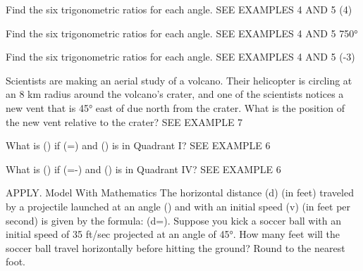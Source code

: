 \documentclass{article}
\newenvironment{practice}[2]{}{}        %
\newcommand{\answer}[1]{}               %
\newcommand{\placeholder}[2]{}          %
\newcommand{\te}[1]{}                   %
\begin{document}
\begin{practice}{28}{1}
Find the six trigonometric ratios for each angle. SEE EXAMPLES 4 AND 5
(\frac{13\pi}4)
\answer{(\sin\frac{13\pi}4=-\frac{\sqrt2}{2}); (\cos\frac{13\pi}4=-\frac{\sqrt2}{2}); (\tan\frac{13\pi}4=1); (\sec\frac{13\pi}4=-\sqrt2); (\csc\frac{13\pi}4=-\sqrt2); (\cot\frac{13\pi}4=1)}
\end{practice}
\begin{practice}{29}{1}
Find the six trigonometric ratios for each angle. SEE EXAMPLES 4 AND 5
750°
\answer{(\sin750°=\frac12); (\cos750°=\frac{\sqrt3}{2}); (\tan750°=\frac{\sqrt3}{3}); (\sec750°=\frac{2\sqrt3}{3}); (\csc750°=2); (\cot750°=\sqrt3)}
\end{practice}
\begin{practice}{30}{1}
Find the six trigonometric ratios for each angle. SEE EXAMPLES 4 AND 5
(-\frac{2\pi}3)
\answer{(\sin(-\frac{2\pi}3)=-\frac{\sqrt3}{2}); (\cos(-\frac{2\pi}3)=-\frac12); (\tan(-\frac{2\pi}3)=\sqrt3); (\sec(-\frac{2\pi}3)=-2); (\csc(-\frac{2\pi}3)=-\frac{2\sqrt3}{3}); (\cot(-\frac{2\pi}3)=\frac{\sqrt3}{3})}
\end{practice}
\begin{practice}{31}{2}
Scientists are making an aerial study of a volcano. Their helicopter is circling at an 8 km radius around the volcano's crater, and one of the scientists notices a new vent that is 45° east of due north from the crater. What is the position of the new vent relative to the crater? SEE EXAMPLE 7
\placeholder{illustration}{Overhead volcano crater with smoke; black circular helicopter path centered at crater, radius westward labeled 8 km. Yellow helicopter at east side, small glowing vent near northeast circumference.}
\answer{Sample: The point (4\sqrt2,4\sqrt2) represents a position that is about 5.7 km east and about 5.7 km north of the valley.}
\te{Printed ``valley''; likely ``crater''.}
\end{practice}
\begin{practice}{32}{2}
What is (\sin\theta) if (\cos\theta=) and (\theta) is in Quadrant I? SEE EXAMPLE 6
\answer{(\sin\theta=\frac{15}{17})}
\end{practice}
\begin{practice}{33}{2}
What is (\cos\theta) if (\sin\theta=-) and (\theta) is in Quadrant IV? SEE EXAMPLE 6
\answer{(\cos\theta=\frac7{25})}
\end{practice}
\begin{practice}{34}{2}
APPLY. Model With Mathematics The horizontal distance (d) (in feet) traveled by a projectile launched at an angle (\theta) and with an initial speed (v) (in feet per second) is given by the formula: (d=\theta). Suppose you kick a soccer ball with an initial speed of 35 ft/sec projected at an angle of 45°. How many feet will the soccer ball travel horizontally before hitting the ground? Round to the nearest foot.
\answer{about 38 ft}
\end{practice}
\end{document}

